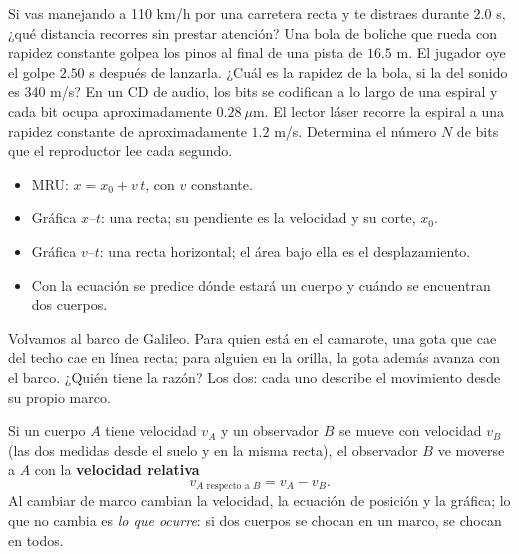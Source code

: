 \documentclass[11pt]{article}
\begin{document}
\begin{preguntas}
\pregunta Si vas manejando a 110 km/h por una carretera recta y te distraes durante
$\num{2,0}$ s, ¿qué distancia recorres sin prestar atención?
\espacio{2.5cm}
\pregunta Una bola de boliche que rueda con rapidez constante golpea los pinos al final de una
pista de $\num{16,5}$ m. El jugador oye el golpe $\num{2,50}$ s después de lanzarla. ¿Cuál es la
rapidez de la bola, si la del sonido es 340 m/s?
\espacio{3cm}
\pregunta En un CD de audio, los bits se codifican a lo largo de una espiral y cada bit ocupa
aproximadamente $\num{0,28}\ \mu$m. El lector láser recorre la espiral a una rapidez constante
de aproximadamente $\num{1,2}$ m/s. Determina el número $N$ de bits que el reproductor lee cada
segundo.
\espacio{2.5cm}
\end{preguntas}

\begin{resumen}
\begin{itemize}
  \item MRU: $x = x_0 + v\,t$, con $v$ constante.
  \item Gráfica $x$--$t$: una recta; su pendiente es la velocidad y su corte, $x_0$.
  \item Gráfica $v$--$t$: una recta horizontal; el área bajo ella es el desplazamiento.
  \item Con la ecuación se predice dónde estará un cuerpo y cuándo se encuentran dos cuerpos.
\end{itemize}
\end{resumen}

\label{tema:marcos}

\begin{hilo}
Volvamos al barco de Galileo. Para quien está en el camarote, una gota que cae del techo cae
en línea recta; para alguien en la orilla, la gota además avanza con el barco. ¿Quién tiene
la razón? Los dos: cada uno describe el movimiento desde su propio marco.
\end{hilo}

Si un cuerpo $A$ tiene velocidad $v_A$ y un observador $B$ se mueve con velocidad $v_B$ (las
dos medidas desde el suelo y en la misma recta), el observador $B$ ve moverse a $A$ con la
\textbf{velocidad relativa}
\[
  v_{A\text{ respecto a }B} = v_A - v_B.
\]
Al cambiar de marco cambian la velocidad, la ecuación de posición y la gráfica; lo que no
cambia es \emph{lo que ocurre}: si dos cuerpos se chocan en un marco, se chocan en todos.
\end{document}
